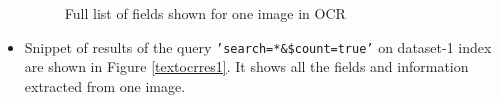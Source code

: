 \begin{itemize}
\begin{figure}[h!h]
      \caption{Full list of fields shown for one image in \acs{OCR}}
      \label{sentiocrres}
    \end{figure}
    \item \label{item:textocrresults} Snippet of results of the query \texttt{’search=*\&\$count=true’} on dataset-1 index are shown in Figure \ref{textocrres1}. It shows all the fields and information extracted from one image.
    \begin{figure}[h!h]
      \centering

\end{figure}
\end{itemize}
